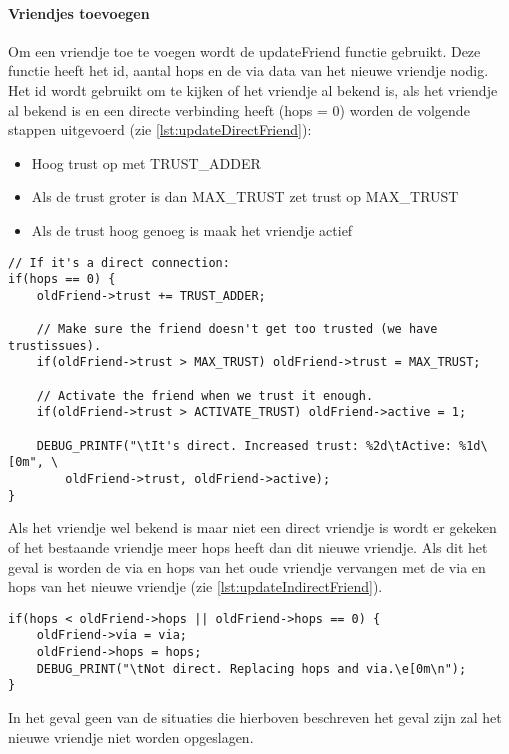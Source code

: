    \paragraph{Vriendjes toevoegen}
        Om een vriendje toe te voegen wordt de updateFriend functie gebruikt. Deze functie heeft het id, aantal hops en de via data van het nieuwe vriendje nodig. Het id wordt gebruikt om te kijken of het vriendje al bekend is, als het vriendje al bekend is en een directe verbinding heeft (hops = 0) worden de volgende stappen uitgevoerd (zie \autoref{lst:updateDirectFriend}):
        \begin{itemize}
            \item Hoog trust op met TRUST\_ADDER
            \item Als de trust groter is dan MAX\_TRUST zet trust op MAX\_TRUST
            \item Als de trust hoog genoeg is maak het vriendje actief
        \end{itemize}
\begin{lstlisting}[caption={Update direct vriendje},captionpos=b,label={lst:updateDirectFriend},style=c,xleftmargin=.\textwidth,xrightmargin=.\textwidth]
// If it's a direct connection:
if(hops == 0) {
    oldFriend->trust += TRUST_ADDER;

    // Make sure the friend doesn't get too trusted (we have trustissues).
    if(oldFriend->trust > MAX_TRUST) oldFriend->trust = MAX_TRUST;

    // Activate the friend when we trust it enough.
    if(oldFriend->trust > ACTIVATE_TRUST) oldFriend->active = 1;

    DEBUG_PRINTF("\tIt's direct. Increased trust: %2d\tActive: %1d\[0m", \ 
        oldFriend->trust, oldFriend->active);
}
\end{lstlisting}
        Als het vriendje wel bekend is maar niet een direct vriendje is wordt er gekeken of het bestaande vriendje meer hops heeft dan dit nieuwe vriendje. Als dit het geval is worden de via en hops van het oude vriendje vervangen met de via en hops van het nieuwe vriendje (zie \autoref{lst:updateIndirectFriend}). 
\begin{lstlisting}[caption={Update indirect vriendje},captionpos=b,label={lst:updateIndirectFriend},style=c,xleftmargin=.\textwidth,xrightmargin=.\textwidth]
if(hops < oldFriend->hops || oldFriend->hops == 0) {
    oldFriend->via = via;
    oldFriend->hops = hops;
    DEBUG_PRINT("\tNot direct. Replacing hops and via.\e[0m\n");
}
\end{lstlisting}
        In het geval geen van de situaties die hierboven beschreven het geval zijn zal het nieuwe vriendje niet worden opgeslagen.

